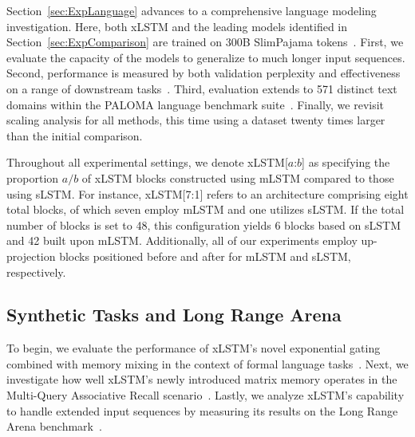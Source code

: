 Section~\ref{sec:ExpLanguage} advances to a comprehensive language modeling investigation. Here, both xLSTM and the leading models identified in Section~\ref{sec:ExpComparison} are trained on 300B SlimPajama tokens~\citep{Soboleva:23}. First, we evaluate the capacity of the models to generalize to much longer input sequences. Second, performance is measured by both validation perplexity and effectiveness on a range of downstream tasks~\citep{Sutawika:24}. Third, evaluation extends to 571 distinct text domains within the PALOMA language benchmark suite~\citep{Magnusson:23arxivshort}. Finally, we revisit scaling analysis for all methods, this time using a dataset twenty times larger than the initial comparison.

\label{sec:xlstm_blocks_notation}
Throughout all experimental settings, we denote xLSTM[$a$:$b$] as specifying the proportion $a/b$ of xLSTM blocks constructed using mLSTM compared to those using sLSTM. For instance, xLSTM[7:1] refers to an architecture comprising eight total blocks, of which seven employ mLSTM and one utilizes sLSTM. If the total number of blocks is set to 48, this configuration yields 6 blocks based on sLSTM and 42 built upon mLSTM. Additionally, all of our experiments employ up-projection blocks positioned before and after for mLSTM and sLSTM, respectively.

\subsection{Synthetic Tasks and Long Range Arena}
\label{sec:ExpSyntethic}
To begin, we evaluate the performance of xLSTM's novel exponential gating combined with memory mixing in the context of formal language tasks~\citep{Deletang:23}. Next, we investigate how well xLSTM's newly introduced matrix memory operates in the Multi-Query Associative Recall scenario~\citep{Arora:23arxiv}. Lastly, we analyze xLSTM's capability to handle extended input sequences by measuring its results on the Long Range Arena benchmark~\citep{Tay:21}.

